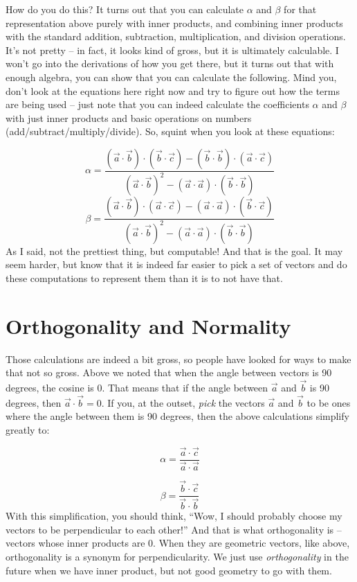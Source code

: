 \documentclass[
]{book}
\begin{document}
How do you do this? It turns out that you can calculate \(\alpha\) and \(\beta\) for that representation above purely with inner products, and combining inner products with the standard addition, subtraction, multiplication, and division operations. It's not pretty -- in fact, it looks kind of gross, but it is ultimately calculable. I won't go into the derivations of how you get there, but it turns out that with enough algebra, you can show that you can calculate the following. Mind you, don't look at the equations here right now and try to figure out how the terms are being used -- just note that you can indeed calculate the coefficients \(\alpha\) and \(\beta\) with just inner products and basic operations on numbers (add/subtract/multiply/divide). So, squint when you look at these equations:

\[\alpha = \frac{(\vec{a}\cdot\vec{b})\cdot(\vec{b}\cdot\vec{c})-(\vec{b}\cdot\vec{b})\cdot(\vec{a}\cdot\vec{c})}{(\vec{a}\cdot\vec{b})^2 - (\vec{a}\cdot\vec{a})\cdot(\vec{b}\cdot\vec{b})}\]
\[\beta = \frac{(\vec{a}\cdot\vec{b})\cdot(\vec{a}\cdot\vec{c})-(\vec{a}\cdot\vec{a})\cdot(\vec{b}\cdot\vec{c})}{(\vec{a}\cdot\vec{b})^2 - (\vec{a}\cdot\vec{a})\cdot(\vec{b}\cdot\vec{b})}\]
As I said, not the prettiest thing, but computable! And that is the goal. It may seem harder, but know that it is indeed far easier to pick a set of vectors and do these computations to represent them than it is to not have that.

\hypertarget{orthogonality-and-normality}{%
\section{Orthogonality and Normality}\label{orthogonality-and-normality}}

Those calculations are indeed a bit gross, so people have looked for ways to make that not so gross. Above we noted that when the angle between vectors is 90 degrees, the cosine is 0. That means that if the angle between \(\vec{a}\) and \(\vec{b}\) is 90 degrees, then \(\vec{a}\cdot\vec{b} = 0\). If you, at the outset, \emph{pick} the vectors \(\vec{a}\) and \(\vec{b}\) to be ones where the angle between them is 90 degrees, then the above calculations simplify greatly to:

\[\alpha = \frac{\vec{a}\cdot\vec{c}}{\vec{a}\cdot\vec{a}}\]

\[\beta = \frac{\vec{b}\cdot\vec{c}}{\vec{b}\cdot\vec{b}}\]
With this simplification, you should think, ``Wow, I should probably choose my vectors to be perpendicular to each other!'' And that is what orthogonality is -- vectors whose inner products are 0. When they are geometric vectors, like above, orthogonality is a synonym for perpendicularity. We just use \emph{orthogonality} in the future when we have inner product, but not good geometry to go with them.
\end{document}
